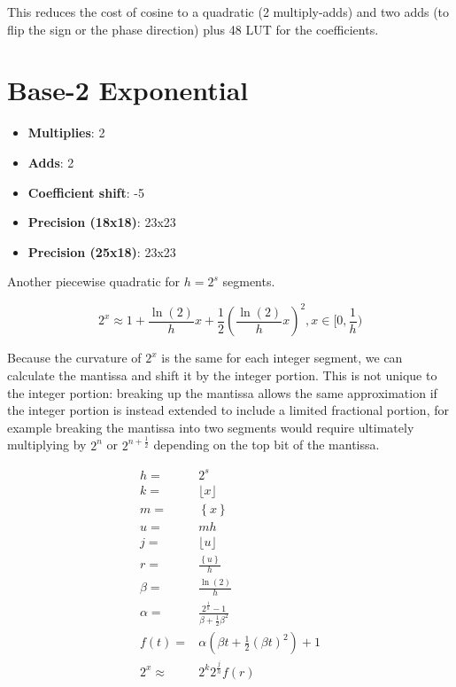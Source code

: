 This reduces the cost of cosine to a quadratic (2 multiply-adds) and two adds (to flip the sign or the phase direction) plus 48 LUT for the coefficients.

\section{Base-2 Exponential}

\begin{itemize}
	\item \textbf{Multiplies}:  2
	\item \textbf{Adds}: 2
	\item \textbf{Coefficient shift}:  -5
	\item \textbf{Precision (18x18)}:  23x23
	\item \textbf{Precision (25x18)}:  23x23
\end{itemize}

Another piecewise quadratic for $h=2^s$ segments.

\begin{equation*}
	2^x\approx1+\frac{\ln(2)}{h}x+\frac{1}{2}\left(\frac{\ln(2)}{h}x\right)^{2}, x\in[0,\frac{1}{h})
\end{equation*}

Because the curvature of $2^x$ is the same for each integer segment, we can calculate the mantissa and shift it by the integer portion.  This is not unique to the integer portion:  breaking up the mantissa allows the same approximation if the integer portion is instead extended to include a limited fractional portion, for example breaking the mantissa into two segments would require ultimately multiplying by $2^n$ or $2^{n+\frac{1}{2}}$ depending on the top bit of the mantissa.

\begin{align*}
	h=&2^s \\
	k=&\lfloor x \rfloor \\
	m=&\left\{x\right\} \\
	u=&mh \\
	j=&\lfloor u \rfloor \\
	r=&\frac{\left\{u\right\}}{h} \\
	\beta=&\frac{\ln\left(2\right)}{h} \\
	\alpha=&\frac{2^\frac{1}{h}-1}{\beta+\frac{1}{2}\beta^2}\\
	f\left(t\right)=&\alpha\left(\beta t + \frac{1}{2}\left(\beta t\right)^2\right)+1\\
	2^x\approx& 2^k2^{\frac{j}{h}}f\left(r\right)
\end{align*}

